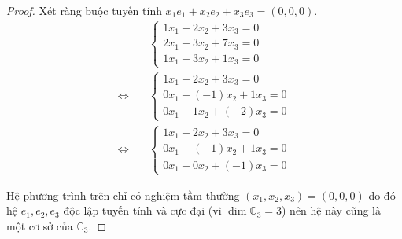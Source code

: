 \begin{proof}
    Xét ràng buộc tuyến tính $x_{1}e_{1} + x_{2}e_{2} + x_{3}e_{3} = (0, 0, 0)$.
    \begingroup
    \begin{align*}
                             & \begin{cases}
                                   1x_{1} + 2x_{2} + 3x_{3} = 0 \\
                                   2x_{1} + 3x_{2} + 7x_{3} = 0 \\
                                   1x_{1} + 3x_{2} + 1x_{3} = 0
                               \end{cases} \\
        \Longleftrightarrow\quad &
        \begin{cases}
            1x_{1} + 2x_{2} + 3x_{3} = 0    \\
            0x_{1} + (-1)x_{2} + 1x_{3} = 0 \\
            0x_{1} + 1x_{2} + (-2)x_{3} = 0
        \end{cases}                     \\
        \Longleftrightarrow\quad &
        \begin{cases}
            1x_{1} + 2x_{2} + 3x_{3} = 0    \\
            0x_{1} + (-1)x_{2} + 1x_{3} = 0 \\
            0x_{1} + 0x_{2} + (-1)x_{3} = 0
        \end{cases}
    \end{align*}
    \endgroup
    
    Hệ phương trình trên chỉ có nghiệm tầm thường $(x_{1}, x_{2}, x_{3}) = (0, 0, 0)$ do đó hệ $e_{1}, e_{2}, e_{3}$ độc lập tuyến tính và cực đại (vì $\dim\mathbb{C}_{3} = 3$) nên hệ này cũng là một cơ sở của $\mathbb{C}_{3}$.


\end{proof}
